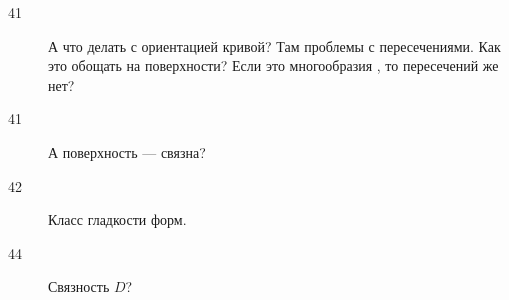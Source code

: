 \documentclass[timbord]{longnotes}
\begin{document}
\begin{description}
  \item[41] А что делать с ориентацией кривой? Там проблемы с пересечениями. 
    Как это обощать на поверхности? Если это многообразия , то пересечений же нет?
  \item[41] А поверхность --- связна?
  \item[42] Класс гладкости форм.
  \item[44] Связность $D$? 
\end{description}
\end{document}
